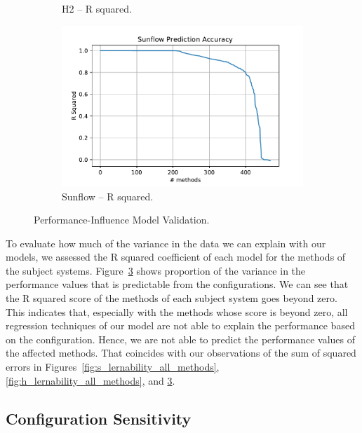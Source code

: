 \begin{figure}[h]
\begin{subfigure}{.5\textwidth}
	  \caption{H2 -- R squared.}
	  \label{fig:catena_model_r_sq}
	\end{subfigure}
	\begin{subfigure}{.5\textwidth}
	  \centering
	  \includegraphics[width=.99\linewidth]{images/Sunflow_plt_learnable_func_all_model_r_sq}
	  \caption{Sunflow -- R squared.}
	  \label{fig:catena_model_r_sq}
	\end{subfigure}
	\caption{Performance-Influence Model Validation.}
	\label{fig:c_lernability_all_methods}
\end{figure}

To evaluate how much of the variance in the data we can explain with our models, we assessed the R squared coefficient of each model for the methods of the subject systems. Figure~\ref{fig:c_lernability_all_methods} shows proportion of the variance in the performance values that is predictable from the configurations. We can see that the R squared score of the methods of each subject system goes beyond zero. This indicates that, especially with the methods whose score is beyond zero, all regression techniques of our model are not able to explain the performance based on the configuration. Hence, we are not able to predict the performance values of the affected methods. That coincides with our observations of the sum of squared errors in Figures~\ref{fig:s_lernability_all_methods}, \ref{fig:h_lernability_all_methods}, and \ref{fig:c_lernability_all_methods}.



\subsection{Configuration Sensitivity}
\label{conf_sens}

